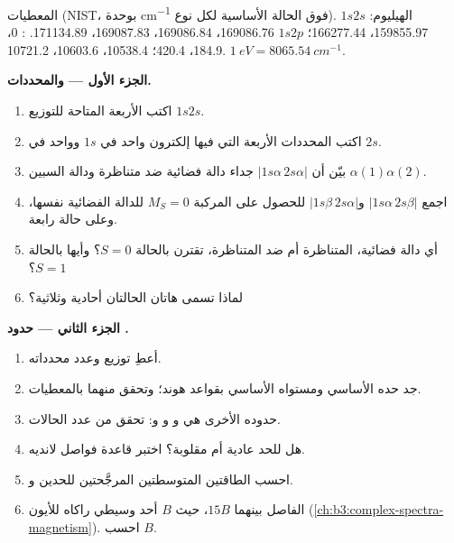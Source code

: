 \begin{problem}
\label{pb:b3:many-electron-atoms:1}
المعطيات (NIST، بوحدة \unit{cm^{-1}} فوق الحالة الأساسية لكل نوع). الهيليوم:
$1s2s$  159855.97،  166277.44؛ $1s2p$
 169086.76، 169086.84، 169087.83، 
171134.89. :  0، 184.9، 420.4؛ 
10538.4، 10603.6، 10721.2. $\qty{1}{eV} = \qty{8065.54}{cm^{-1}}$.

\medskip\noindent\textbf{الجزء الأول ---  والمحددات.}
\begin{enumerate}
  \item اكتب  الأربعة المتاحة للتوزيع $1s2s$.
  \item اكتب المحددات الأربعة التي فيها إلكترون واحد في $1s$ وواحد في
        $2s$.
  \item بيّن أن $|1s\alpha\,2s\alpha|$ جداء دالة فضائية ضد متناظرة
        ودالة السبين $\alpha(1)\alpha(2)$.
  \item اجمع $|1s\alpha\,2s\beta|$ و$|1s\beta\,2s\alpha|$ للحصول على
        المركبة $M_S = 0$ للدالة الفضائية نفسها، وعلى حالة رابعة.
  \item أي دالة فضائية، المتناظرة أم ضد المتناظرة، تقترن
        بالحالة $S = 0$؟ وأيها بالحالة $S = 1$؟
  \item لماذا تسمى هاتان الحالتان أحادية وثلاثية؟
\end{enumerate}

\medskip\noindent\textbf{الجزء الثاني --- حدود .}
\begin{enumerate}[resume]
  \item أعطِ توزيع  وعدد
        محدداته.
  \item جد حده الأساسي ومستواه الأساسي بقواعد هوند؛ وتحقق منهما
        بالمعطيات.
  \item حدوده الأخرى هي  و و و: تحقق من عدد
        الحالات.
  \item هل  للحد  عادية أم مقلوبة؟ اختبر قاعدة
        فواصل لانديه.
  \item احسب الطاقتين المتوسطتين المرجَّحتين للحدين  و.
  \item الفاصل بينهما $15B$، حيث $B$ أحد وسيطي راكاه
        للأيون (\cref{ch:b3:complex-spectra-magnetism}). احسب $B$.
\end{enumerate}


\end{problem}
